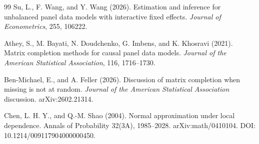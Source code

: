 \documentclass{article}
\begin{document}
\begin{thebibliography}{99}
   Su, L., F. Wang, and Y. Wang (2026). Estimation and inference for unbalanced panel data models with interactive fixed effects. \emph{Journal of Econometrics}, 255, 106222.

   Athey, S., M. Bayati, N. Doudchenko, G. Imbens, and K. Khosravi (2021). Matrix completion methods for causal panel data models. \emph{Journal of the American Statistical Association}, 116, 1716--1730.

   Ben-Michael, E., and A. Feller (2026). Discussion of matrix completion when missing is not at random. \emph{Journal of the American Statistical Association} discussion. arXiv:2602.21314.

   Chen, L. H. Y., and Q.-M. Shao (2004). Normal approximation under local dependence. Annals of Probability 32(3A), 1985--2028. arXiv:math/0410104. DOI: 10.1214/009117904000000450.

\end{thebibliography}
\end{document}
